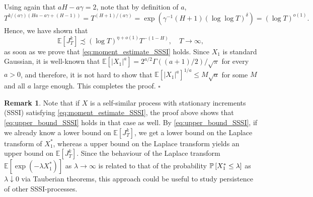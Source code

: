 \documentclass[11pt]{article}
\theoremstyle{plain}
\theoremstyle{definition}
\newtheorem{remark}[thm]{Remark}
\renewenvironment{proof}[1][] {\smallskip \noindent {\bf Proof#1.} }{\hspace*{\fill}$\square$\medskip\par}
\begin{document}
\begin{proof}[ of Proposition~\ref{prop:moment_disorder_current_functional}]
Using again that $aH - a\gamma = 2$, note that by definition of $a$,
\[
   T^{k/(a\gamma) (Ha - a\gamma + (H-1))} = T^{(H+1)/(a\gamma)} = \exp( \gamma^{-1}(H+1) (\log\log T)^\delta ) = (\log T)^{o(1)}.
\]
Hence, we have shown that
\[
   {\mathbb{E}\left[{J_T^k}\right]} \precsim (\log T)^{\eta + o(1)} T^{-(1-H)}, \quad T \to \infty,
\]
as soon as we prove that \eqref{eq:moment_estimate_SSSI} holds. Since $X_1$ is standard Gaussian, it is well-known that ${\mathbb{E}\left[{{\lvert{X_1}\rvert}^a}\right]} = 2^{a/2} \Gamma((a+1)/2)/\sqrt{\pi}$ for every $a > 0$, and therefore, it is not hard to show that ${\mathbb{E}\left[{{\lvert{X_1}\rvert}^a}\right]}^{1/a} \le M \sqrt{a}$ for some $M$ and all $a$ large enough. This completes the proof.
\end{proof}
\begin{remark}
   Note that if $X$ is a self-similar process with stationary increments (SSSI) satisfying \eqref{eq:moment_estimate_SSSI}, the proof above shows that \eqref{eq:upper_bound_SSSI} holds in that case as well. By \eqref{eq:upper_bound_SSSI}, if we already know a lower bound on ${\mathbb{E}\left[{J_T^k}\right]}$, we get a lower bound on the Laplace transform of $X_1^*$, whereas a upper bound on the Laplace transform yields an upper bound on ${\mathbb{E}\left[{J_T^k}\right]}$. Since the behaviour of the Laplace transform ${\mathbb{E}\left[{\exp(-\lambda X_1^*)}\right]}$ as $\lambda \to \infty$ is related to that of the probability ${{{\bf {\mathbb{P}}}}\left[{X_1^* \le \lambda}\right]}$ as $\lambda \downarrow 0$ via Tauberian theorems, this approach could be useful to study persistence of other SSSI-processes. 
\end{remark}
\end{document}
